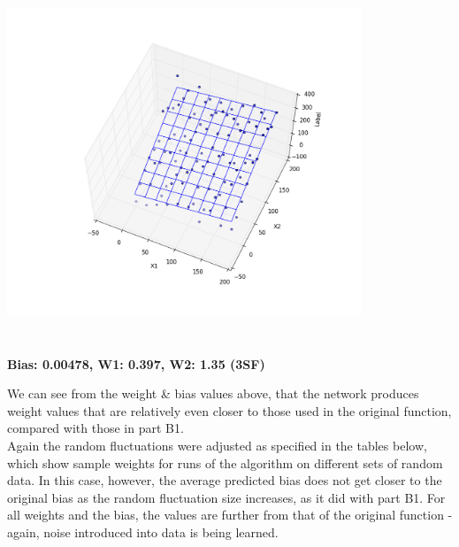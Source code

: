 \documentclass{article}
\begin{document}
\begin{center}
\vspace{2mm}
\centerline{\includegraphics[width=400px, height=400px]{partB2_3}}
\vspace{2mm}
\textbf{Bias: 0.00478, W1: 0.397, W2: 1.35 (3SF)}\\
\end{center}

\noindent We can see from the weight \& bias values above, that the network produces weight values that are relatively even closer to those used in the original function, compared with those in part B1. \\
\indent Again the random fluctuations were adjusted as specified in the tables below, which show sample weights for runs of the algorithm on different sets of random data. In this case, however, the average predicted bias does not get closer to the original bias as the random fluctuation size increases, as it did with part B1. For all weights and the bias, the values are further from that of the original function - again, noise introduced into data is being learned.
\end{document}
